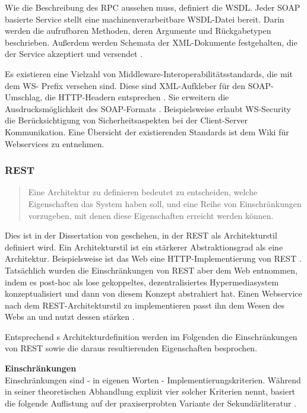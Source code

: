 \documentclass[12pt,a4paper,bibliography=totocnumbered,listof=totoc]{scrartcl}
\begin{document}
Wie die Beschreibung des \ac{RPC} aussehen muss, definiert die \ac{WSDL}. Jeder SOAP basierte Service stellt eine machinenverarbeitbare \ac{WSDL}-Datei bereit. Darin werden die aufrufbaren Methoden, deren Argumente und Rückgabetypen beschrieben. Außerdem werden Schemata der XML-Dokumente festgehalten, die der Service akzeptiert und versendet \citep{richardson07}.

Es existieren eine Vielzahl von Middleware-Interoperabilitätsstandards, die mit dem \glqq WS-\grqq{} Prefix versehen sind. Diese sind \glqq XML-Aufkleber\grqq{} für den SOAP-Umschlag, die HTTP-Headern entsprechen \citep{richardson07}. Sie erweitern die Ausdrucksmöglichkeit des SOAP-Formats \citep{wilde11}. Beispielsweise erlaubt WS-Security die Berücksichtigung von Sicherheitsaspekten bei der Client-Server Kommunikation. Eine Übersicht der existierenden Standards ist dem Wiki für Webservices \citet{webServiceWiki09} zu entnehmen.

\subsubsection{REST}
\begin{quote}
\glqq Eine Architektur zu definieren bedeutet zu entscheiden, welche Eigenschaften das System haben soll, und eine Reihe von Einschränkungen vorzugeben, mit denen diese Eigenschaften erreicht werden können.\grqq{} \citep{tilkov11}
\end{quote}

Dies ist in der Dissertation von \citeauthor{fielding00} geschehen, in der REST als Architekturstil definiert wird. Ein Architekturstil ist ein stärkerer Abstraktionsgrad als eine Architektur. Beispielsweise ist das Web eine HTTP-Implementierung von REST \citep{tilkov11}. Tatsächlich wurden die Einschränkungen von REST aber dem Web entnommen, indem \citeauthor{fielding00} es post-hoc als lose gekoppeltes, dezentralisiertes Hypermediasystem konzeptualisiert \citep{wilde11} und dann von diesem Konzept abstrahiert hat. Einen Webservice nach dem REST-Architekturstil zu implementieren passt ihn dem Wesen des Webs an und nutzt dessen stärken \citep{tilkov11}.

Entsprechend \citeauthor{tilkov11}s Architekturdefinition werden im Folgenden die Einschränkungen von REST sowie die daraus resultierenden Eigenschaften besprochen.

\textbf{Einschränkungen}\\
Einschränkungen sind - in eigenen Worten - Implementierungskriterien. Während \citeauthor{fielding00} in seiner theoretischen Abhandlung explizit vier solcher Kriterien nennt, basiert die folgende Auflistung auf der praxiserprobten Variante der Sekundärliteratur \citep{wilde11, tilkov11}.
\end{document}
